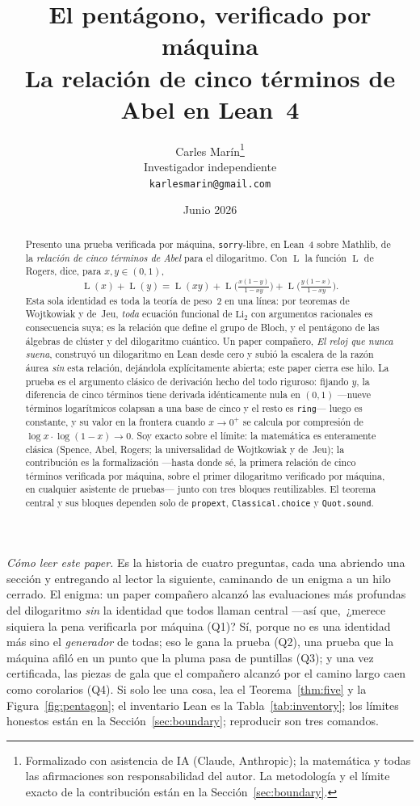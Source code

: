 \documentclass[11pt]{article}
\title{\bf El pent\'agono, verificado por m\'aquina\\[4pt]
  \large\normalfont La relaci\'on de cinco t\'erminos de Abel en Lean~4}
\author{Carles Mar\'in\thanks{Formalizado con asistencia de IA (Claude, Anthropic); la
matem\'atica y todas las afirmaciones son responsabilidad del autor. La metodolog\'ia y el
l\'imite exacto de la contribuci\'on est\'an en la Secci\'on~\ref{sec:boundary}.}\\[3pt]
  \normalsize Investigador independiente\\
  \normalsize \texttt{karlesmarin@gmail.com}}
\date{Junio 2026}
\newcommand{\lean}[1]{\texttt{#1}}
\newcommand{\Li}{\mathrm{Li}_2}
\DeclareMathOperator{\Lrog}{L}
\begin{document}
\maketitle

\begin{abstract}
Presento una prueba verificada por m\'aquina, \lean{sorry}-libre, en Lean~4 sobre Mathlib,
de la \emph{relaci\'on de cinco t\'erminos de Abel} para el dilogaritmo. Con $\Lrog$ la
funci\'on $\Lrog$ de Rogers, dice, para $x,y\in(0,1)$,
\[
  \Lrog(x)+\Lrog(y)=\Lrog(xy)+\Lrog\!\Big(\tfrac{x(1-y)}{1-xy}\Big)
    +\Lrog\!\Big(\tfrac{y(1-x)}{1-xy}\Big).
\]
Esta sola identidad es toda la teor\'ia de peso~2 en una l\'inea: por teoremas de Wojtkowiak
y de~Jeu, \emph{toda} ecuaci\'on funcional de $\Li$ con argumentos racionales es
consecuencia suya; es la relaci\'on que define el grupo de Bloch, y el pent\'agono de las
\'algebras de cl\'uster y del dilogaritmo cu\'antico. Un paper compa\~nero, \emph{El reloj
que nunca suena}, construy\'o un dilogaritmo en Lean desde cero y subi\'o la escalera de la
raz\'on \'aurea \emph{sin} esta relaci\'on, dej\'andola expl\'icitamente abierta; este paper
cierra ese hilo. La prueba es el argumento cl\'asico de derivaci\'on hecho del todo riguroso:
fijando $y$, la diferencia de cinco t\'erminos tiene derivada id\'enticamente nula en
$(0,1)$ ---nueve t\'erminos logar\'itmicos colapsan a una base de cinco y el resto es
\lean{ring}--- luego es constante, y su valor en la frontera cuando $x\to0^+$ se calcula por
compresi\'on de $\log x\cdot\log(1-x)\to0$. Soy exacto sobre el l\'imite: la matem\'atica es
enteramente cl\'asica (Spence, Abel, Rogers; la universalidad de Wojtkowiak y de~Jeu); la
contribuci\'on es la formalizaci\'on ---hasta donde s\'e, la primera relaci\'on de cinco
t\'erminos verificada por m\'aquina, sobre el primer dilogaritmo verificado por m\'aquina, en
cualquier asistente de pruebas--- junto con tres bloques reutilizables. El teorema central y
sus bloques dependen solo de \lean{propext}, \lean{Classical.choice} y \lean{Quot.sound}.
\end{abstract}

\medskip
\noindent\emph{C\'omo leer este paper.} Es la historia de cuatro preguntas, cada una abriendo
una secci\'on y entregando al lector la siguiente, caminando de un enigma a un hilo cerrado.
El enigma: un paper compa\~nero alcanz\'o las evaluaciones m\'as profundas del dilogaritmo
\emph{sin} la identidad que todos llaman central ---as\'i que, \,¿merece siquiera la pena
verificarla por m\'aquina (Q1)? S\'i, porque no es una identidad m\'as sino el
\emph{generador} de todas; eso le gana la prueba (Q2), una prueba que la m\'aquina afil\'o
en un punto que la pluma pasa de puntillas (Q3); y una vez certificada, las piezas de gala
que el compa\~nero alcanz\'o por el camino largo caen como corolarios (Q4). Si solo lee una
cosa, lea el Teorema~\ref{thm:five} y la Figura~\ref{fig:pentagon}; el inventario Lean es la
Tabla~\ref{tab:inventory}; los l\'imites honestos est\'an en la Secci\'on~\ref{sec:boundary};
reproducir son tres comandos.
\end{document}
